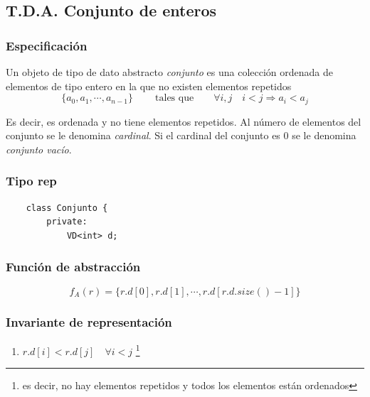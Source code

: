 \documentclass[10pt,a4paper,spanish]{report}
\begin{document}
\subsection{\textcolor[rgb]{0.8,0.2,0.2}T.D.A. Conjunto de enteros}
\subsubsection{\textcolor[rgb]{0.8,0.2,0.2}Especificación}
\noindent
Un objeto de tipo de dato abstracto \textit{\textcolor[rgb]{0.8,0.2,0.2}{conjunto}}
es una colección ordenada de elementos de tipo entero en la que no existen elementos
repetidos
\begin{displaymath}
    \{a_{0}, a_{1}, \cdots, a_{n-1}\} \qquad\ \textrm{tales que} \qquad \forall i, j \quad i < j \Longrightarrow a_{i} < a_{j}
\end{displaymath}

\noindent
Es decir, es ordenada y no tiene elementos repetidos. Al número de elementos del conjunto
se le denomina \textit{\textcolor[rgb]{0.8,0.2,0.2}{cardinal}}. Si el cardinal del conjunto es $0$ se le denomina
\textit{\textcolor[rgb]{0.8,0.2,0.2}{conjunto vacío}}.

\subsubsection{\textcolor[rgb]{0.8,0.2,0.2}Tipo rep}
\begin{verbatim}
    class Conjunto {
        private:
            VD<int> d;
\end{verbatim}

\subsubsection{\textcolor[rgb]{0.8,0.2,0.2}Función de abstracción}
\begin{displaymath}
    f_{A}(r) = \{r.d[0], r.d[1], \cdots, r.d[r.d.size()-1]\}
\end{displaymath}

\subsubsection{\textcolor[rgb]{0.8,0.2,0.2}Invariante de representación}
\begin{enumerate}[$\bullet$]
    \item $r.d[i] < r.d[j] \quad \forall i < j$ \footnote{es decir, no hay elementos repetidos y todos los elementos están ordenados}
\end{enumerate}
\end{document}
